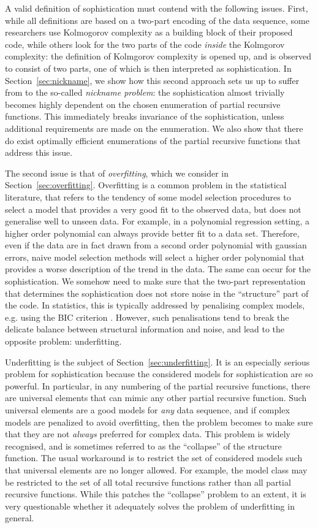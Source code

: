 \documentclass{style/llncs}
\begin{document}
A valid definition of sophistication must contend with the following issues. First, while all definitions are based on a two-part encoding of the data sequence, some researchers use Kolmogorov complexity as a building block of their proposed code, while others look for the two parts of the code \emph{inside} the Kolmgorov complexity: the definition of Kolmgorov complexity is opened up, and is observed to consist of two parts, one of which is then interpreted as sophistication. In Section~\ref{sec:nickname}, we show how this second approach sets us up to suffer from to the so-called \emph{nickname problem}: the sophistication almost trivially becomes highly dependent on the chosen enumeration of partial recursive functions. This immediately breaks invariance of the sophistication, unless additional requirements are made on the enumeration. We also show that there do exist optimally efficient enumerations of the partial recursive functions that address this issue.

The second issue is that of \emph{overfitting}, which we consider in Section~\ref{sec:overfitting}. Overfitting is a common problem in the statistical literature, that refers to the tendency of some model selection procedures to select a model that provides a very good fit to the observed data, but does not generalise well to unseen data. For example, in a polynomial regression setting, a higher order polynomial can always provide better fit to a data set. Therefore, even if the data are in fact drawn from a second order polynomial with gaussian errors, naive model selection methods will select a higher order polynomial that provides a worse description of the trend in the data. The same can occur for the sophistication. We somehow need to make sure that the two-part representation that determines the sophistication does not store noise in the ``structure'' part of the code. In statistics, this is typically addressed by penalising complex models, e.g. using the BIC criterion \cite{TODO}. However, such penalisations tend to break the delicate balance between structural information and noise, and lead to the opposite problem: underfitting.

Underfitting is the subject of Section~\ref{sec:underfitting}. It is an especially serious problem for sophistication because the considered models for sophistication are so powerful. In particular, in any numbering of the partial recursive functions, there are universal elements that can mimic any other partial recursive function. Such universal elements are a good models for \emph{any} data sequence, and if complex models are penalized to avoid overfitting, then the problem becomes to make sure that they are not \emph{always} preferred for complex data. This problem is widely recognised, and is sometimes referred to as the ``collapse'' of the structure function. The usual workaround is to restrict the set of considered models such that universal elements are no longer allowed. For example, the model class may be restricted to the set of all total recursive functions rather than all partial recursive functions. While this patches the ``collapse'' problem to an extent, it is very questionable whether it adequately solves the problem of underfitting in general.
\end{document}

